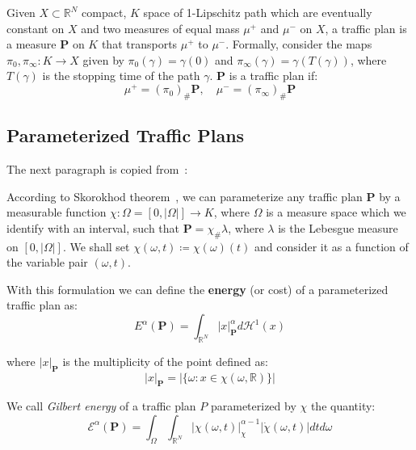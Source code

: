 \documentclass[11pt,reqno,a4paper]{amsart}
\numberwithin{equation}{section}
\theoremstyle{mytheorem}
\theoremstyle{myremark}
\theoremstyle{myparagraph}
\begin{document}
    Given $X \subset \mathbb{R}^N$ compact, $K$ space of 1-Lipschitz path which are eventually constant on $X$ and
    two measures of equal mass $\mu^+$ and $\mu^-$ on $X$, a traffic plan is a measure $\mathbf{P}$ on $K$ that transports $\mu^+$ to $\mu^-$.
    Formally, consider the maps $\pi_0, \pi_\infty : K \rightarrow X$ given by $\pi_0(\gamma) = \gamma(0)$ and $\pi_\infty(\gamma) = \gamma(T(\gamma))$, where $T(\gamma)$
    is the stopping time of the path $\gamma$.
    $\mathbf{P}$ is a traffic plan if:
    \[
        \mu^+ = (\pi_0)_{\#}\mathbf{P}, \quad \mu^- = (\pi_\infty)_{\#}\mathbf{P}
    \]

    \subsection{Parameterized Traffic Plans}
    The next paragraph is copied from~\cite{Bernot}:

    According to Skorokhod theorem~\cite[Theorem A.3]{Bernot}, we can parameterize any traffic plan $\mathbf{P}$ by a measurable function
    $\chi : \Omega = [0, |\Omega|] \rightarrow K$, where $\Omega$ is a measure space which we identify with an interval, such that
    $\mathbf{P}= \chi_{\#} \lambda$, where $\lambda$ is the Lebesgue measure on $[0, |\Omega|]$.
    We shall set $\chi(\omega, t) \coloneqq \chi(\omega)(t)$ and consider it as a function of the variable pair
    $(\omega, t)$.

    With this formulation we can define the \textbf{energy} (or cost) of a parameterized traffic plan as:
    \begin{equation}
        E^{\alpha}(\mathbf{P}) = \int_{\mathbb{R}^N} |x|_\mathbf{P}^{\alpha} d \mathcal{H}^1(x)
    \end{equation}

    where $|x|_\mathbf{P}$ is the multiplicity of the point defined as:
    \begin{equation}
        |x|_\mathbf{P} = | \{\omega: x \in \chi(\omega, \mathbb{R}) \} |
    \end{equation}


    We call \emph{Gilbert energy} of a traffic plan $P$ parameterized by $\chi$ the quantity:
    \begin{equation}
        \mathcal{E}^{\alpha}(\mathbf{P}) = \int_{\Omega} \int_{\mathbb{R}^N} |\chi(\omega, t)|^{\alpha-1}_\chi |\dot{\chi} (\omega, t)| dtd\omega
    \end{equation}
\end{document}
